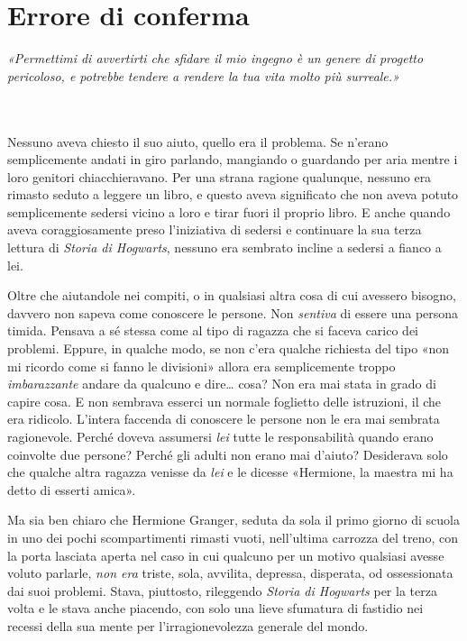 
\chapter{Errore di conferma}
\label{capitolo:8}

\emph{«Permettimi di avvertirti che sfidare il mio ingegno è un genere di progetto pericoloso, e potrebbe tendere a rendere la tua vita molto più surreale.»}

~\\
~\\



Nessuno aveva chiesto il suo aiuto, quello era il problema. Se n’erano semplicemente andati in giro parlando, mangiando o guardando per aria mentre i loro genitori chiacchieravano. Per una strana ragione qualunque, nessuno era rimasto seduto a leggere un libro, e questo aveva significato che non aveva potuto semplicemente sedersi vicino a loro e tirar fuori il proprio libro. E anche quando aveva coraggiosamente preso l’iniziativa di sedersi e continuare la sua terza lettura di \textit{Storia di Hogwarts}, nessuno era sembrato incline a sedersi a fianco a lei.

Oltre che aiutandole nei compiti, o in qualsiasi altra cosa di cui avessero bisogno, davvero non sapeva come conoscere le persone. Non \textit{sentiva} di essere una persona timida. Pensava a sé stessa come al tipo di ragazza che si faceva carico dei problemi. Eppure, in qualche modo, se non c’era qualche richiesta del tipo «non mi ricordo come si fanno le divisioni» allora era semplicemente troppo \textit{imbarazzante} andare da qualcuno e dire… cosa? Non era mai stata in grado di capire cosa. E non sembrava esserci un normale foglietto delle istruzioni, il che era ridicolo. L’intera faccenda di conoscere le persone non le era mai sembrata ragionevole. Perché doveva assumersi \textit{lei} tutte le responsabilità quando erano coinvolte due persone? Perché gli adulti non erano mai d’aiuto? Desiderava solo che qualche altra ragazza venisse da \textit{lei} e le dicesse «Hermione, la maestra mi ha detto di esserti amica».

Ma sia ben chiaro che Hermione Granger, seduta da sola il primo giorno di scuola in uno dei pochi scompartimenti rimasti vuoti, nell’ultima carrozza del treno, con la porta lasciata aperta nel caso in cui qualcuno per un motivo qualsiasi avesse voluto parlarle, \textit{non era} triste, sola, avvilita, depressa, disperata, od ossessionata dai suoi problemi. Stava, piuttosto, rileggendo \textit{Storia di Hogwarts} per la terza volta e le stava anche piacendo, con solo una lieve sfumatura di fastidio nei recessi della sua mente per l’irragionevolezza generale del mondo.


